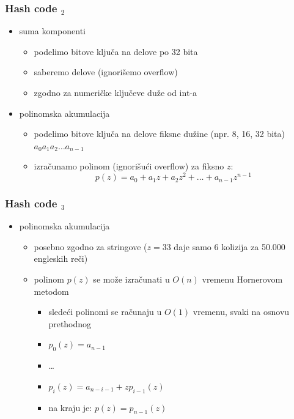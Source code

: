 \documentclass[compress,aspectratio=169]{beamer}
\begin{document}
\begin{frame}[fragile]
  \frametitle{Hash code $_2$}
  \begin{itemize}
    \item suma komponenti
    \begin{itemize}
      \item podelimo bitove ključa na delove po 32 bita
      \item saberemo delove (ignorišemo overflow)
      \item zgodno za numeričke ključeve duže od int-a
    \end{itemize}
    \item polinomska akumulacija
    \begin{itemize}
      \item podelimo bitove ključa na delove fiksne dužine (npr. 8, 16, 32 bita) $a_0 a_1 a_2 \ldots a_{n-1}$
      \item izračunamo polinom (ignorišući overflow) za fiksno $z$:
      $$ p(z) = a_0 + a_1 z + a_2 z^2 + \ldots + a_{n-1} z^{n-1}$$
    \end{itemize}
  \end{itemize}
\end{frame}

\begin{frame}[fragile]
  \frametitle{Hash code $_3$}
  \begin{itemize}
    \item polinomska akumulacija
    \begin{itemize}
      \item posebno zgodno za stringove ($z=33$ daje samo 6 kolizija za 50.000 engleskih reči)
      \item polinom $p(z)$ se može izračunati u $O(n)$ vremenu Hornerovom metodom
      \begin{itemize}
        \item sledeći polinomi se računaju u $O(1)$ vremenu, svaki na osnovu prethodnog
        \item $p_0(z) = a_{n-1}$
        \item \ldots
        \item $p_i(z) = a_{n-i-1} + zp_{i-1}(z)$
        \item na kraju je: $p(z) = p_{n-1}(z)$
      \end{itemize}
    \end{itemize}
  \end{itemize}
\end{frame}
\end{document}
